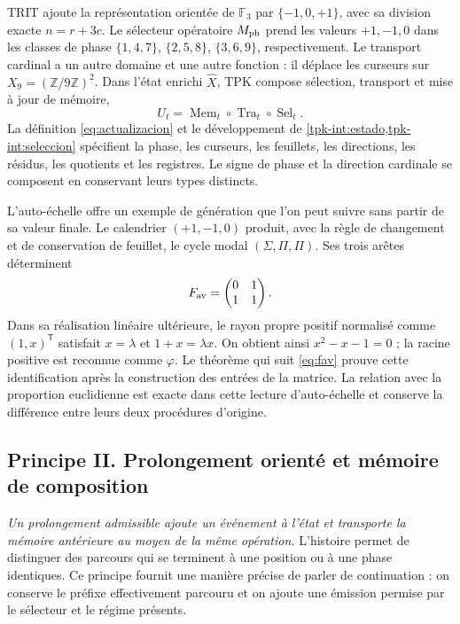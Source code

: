 TRIT ajoute la représentation orientée de \(\mathbb F_3\) par \(\{-1,0,+1\}\), avec sa division exacte \(n=r+3c\). Le sélecteur opératoire \(M_{\rm ph}\) prend les valeurs \(+1,-1,0\) dans les classes de phase \(\{1,4,7\}\), \(\{2,5,8\}\), \(\{3,6,9\}\), respectivement. Le transport cardinal a un autre domaine et une autre fonction : il déplace les curseurs sur \(X_9=(\mathbb Z/9\mathbb Z)^2\). Dans l'état enrichi \(\widehat X\), TPK compose sélection, transport et mise à jour de mémoire,
\[
 U_t=\operatorname{Mem}_t\circ\operatorname{Tra}_t
                    \circ\operatorname{Sel}_t.
\]
La définition \eqref{eq:actualizacion} et le développement de
\cref{tpk-int:estado,tpk-int:seleccion} spécifient la phase, les curseurs, les feuillets,
les directions, les résidus, les quotients et les registres. Le signe de phase et la direction
cardinale se composent en conservant leurs types distincts.

L’auto-échelle offre un exemple de génération que l’on peut suivre sans partir
de sa valeur finale. Le calendrier \((+1,-1,0)\) produit, avec la règle de
changement et de conservation de feuillet, le cycle modal
\((\Sigma,\Pi,\Pi)\). Ses trois arêtes déterminent
\[
 F_{\rm av}=\begin{pmatrix}0&1\\1&1\end{pmatrix}.
\]
Dans sa réalisation linéaire ultérieure, le rayon propre positif normalisé comme \((1,x)^{\mathsf T}\) satisfait \(x=\lambda\) et \(1+x=\lambda x\). On obtient ainsi \(x^2-x-1=0\) ; la racine positive est reconnue comme \(\varphi\). Le théorème qui suit \eqref{eq:fav} prouve cette identification après la construction des entrées de la matrice. La relation avec la proportion euclidienne est exacte dans cette lecture d'auto-échelle et conserve la différence entre leurs deux procédures d'origine.

\subsection*{Principe II. Prolongement orienté et mémoire de composition}
\hypertarget{prinh:prolongacion}{}

\emph{Un prolongement admissible ajoute un événement à l’état et
transporte la mémoire antérieure au moyen de la même opération.} L’histoire
permet de distinguer des parcours qui se terminent à une position ou à une phase
identiques. Ce principe fournit une manière précise de parler de
continuation : on conserve le préfixe effectivement parcouru et on ajoute
une émission permise par le sélecteur et le régime présents.

